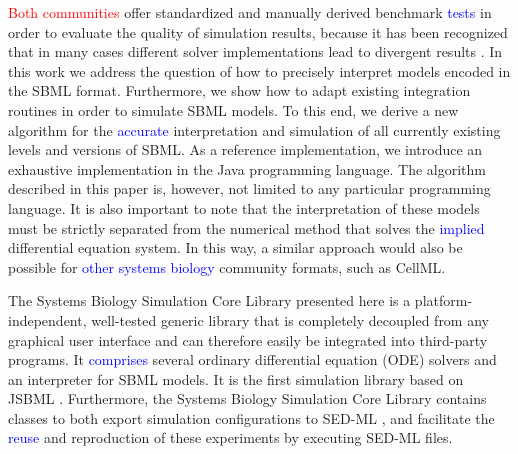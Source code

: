 \documentclass[10pt]{bmc_article}
\newenvironment{bmcformat}{\fussy\setboolean{publ}{true}}{\fussy}
\newcommand{\TODO}[1]{\textcolor{red}{#1}}
\newcommand{\COR}[1]{\textcolor{blue}{#1}}
\begin{document}
\begin{bmcformat}
\TODO{Both communities} offer standardized and manually derived benchmark \COR{tests} in order
to evaluate the quality of simulation results, because it has been recognized
that in many cases different solver implementations lead to divergent results
\cite{Bergmann2008}.
In this work we address the question of how to precisely interpret models
encoded in the \acs{SBML} format. Furthermore, we show how to adapt existing
integration routines in order to simulate \acs{SBML} models.
To this end, we derive a new algorithm for the \COR{accurate} interpretation and 
simulation of all currently existing levels and versions of \acs{SBML}.
As a reference implementation, we introduce an exhaustive implementation in the
Java\texttrademark{} programming language. The algorithm described in this paper
is, however, not limited to any particular programming language. It is also
important to note that the interpretation of these models must be strictly
separated from the numerical method that solves the \COR{implied} differential
equation system. In this way, a similar approach would also be possible for
\COR{other systems biology} community formats, such as CellML.


%
%
%
%
The Systems Biology Simulation Core Library presented here is a platform-independent,
well-tested generic library that is completely decoupled from any graphical
user interface and can therefore easily be integrated into third-party programs.
It \COR{comprises} several ordinary differential equation (ODE)
solvers and an interpreter for \acs{SBML} models. It is the first simulation library
based on JSBML \cite{Draeger2011b}. 
%
%
Furthermore, the Systems Biology Simulation Core Library contains classes to both export
simulation configurations to \acf{SED-ML} \cite{Waltemath2011},
and facilitate the \COR{reuse} and reproduction of these experiments by executing \acs{SED-ML} files.


\end{bmcformat}
\end{document}

